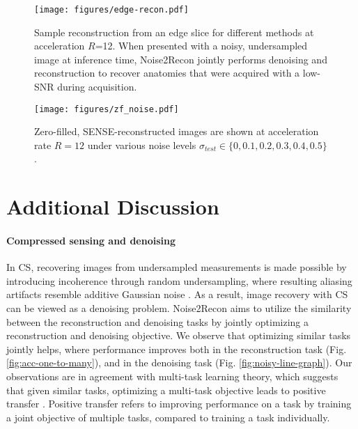 \documentclass[10pt,twocolumn,letterpaper]{article}
\newcommand{\testnoise}{\sigma_{test}}
\begin{document}
\begin{figure}[t!]
  \centering
  \begin{center}
      \texttt{[image: figures/edge-recon.pdf]}
  \end{center}
  \caption{Sample reconstruction from an edge slice for different methods at acceleration $R$=12. When presented with a noisy, undersampled image at inference time, Noise2Recon jointly performs denoising and reconstruction to recover anatomies that were acquired with a low-SNR during acquisition.}
  \label{fig:edge-slice}
\end{figure}

\begin{figure}[t!]
  \centering
  \begin{center}
      \texttt{[image: figures/zf\_noise.pdf]}
  \end{center}
  \caption{Zero-filled, SENSE-reconstructed images are shown at acceleration rate $R = 12$ under various noise levels $\testnoise \in \{0, 0.1, 0.2, 0.3, 0.4, 0.5\}$. }
  \label{fig:zf-noise}
\end{figure}

\section{Additional Discussion}
\paragraph{Compressed sensing and denoising} In CS, recovering images from undersampled measurements is made possible by introducing incoherence through random undersampling, where resulting aliasing artifacts resemble additive Gaussian noise \cite{cs-mri}. As a result, image recovery with CS can be viewed as a denoising problem. Noise2Recon aims to utilize the similarity between the reconstruction and denoising tasks by jointly optimizing a reconstruction and denoising objective. We observe that optimizing similar tasks jointly helps, where performance improves both in the reconstruction task (Fig. \ref{fig:acc-one-to-many}), and in the denoising task (Fig. \ref{fig:noisy-line-graph}). Our observations are in agreement with multi-task learning theory, which suggests that given similar tasks, optimizing a multi-task objective leads to positive transfer \cite{wu2020understanding}. Positive transfer refers to improving performance on a task by training a joint objective of multiple tasks, compared to training a task individually. 
\end{document}
